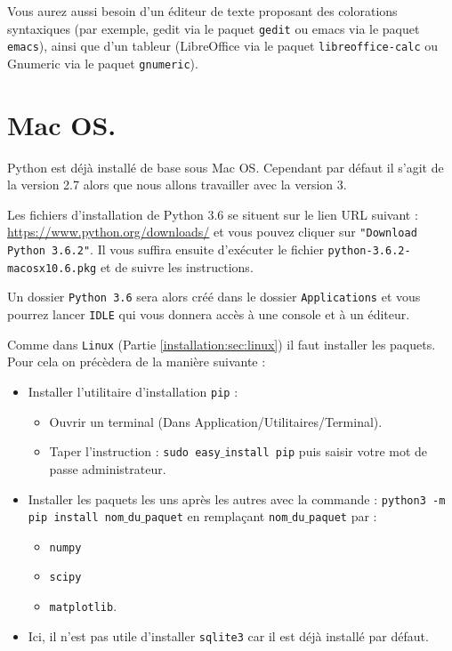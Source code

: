 Vous aurez aussi besoin d'un éditeur de texte proposant des colorations syntaxiques (par exemple, gedit via le paquet \texttt{gedit} ou emacs via le paquet \texttt{emacs}), ainsi que d'un tableur (LibreOffice via le paquet \texttt{libreoffice-calc} ou Gnumeric via le paquet \texttt{gnumeric}).

\section{Mac OS.}

Python est déjà installé de base sous Mac OS. Cependant par défaut il s'agit de la version 2.7 alors que nous allons travailler avec la version 3.

Les fichiers d'installation de Python 3.6 se situent sur le lien URL suivant : \url{https://www.python.org/downloads/} et vous pouvez cliquer sur \texttt{"Download Python 3.6.2"}. Il vous suffira ensuite d'exécuter le fichier \texttt{python-3.6.2-macosx10.6.pkg} et de suivre les instructions.

Un dossier \texttt{Python 3.6} sera alors créé dans le dossier \texttt{Applications} et vous pourrez lancer \texttt{IDLE} qui vous donnera accès à une console et à un éditeur. 

Comme dans \texttt{Linux} (Partie \ref{installation:sec:linux}) il faut installer les paquets. Pour cela on précèdera de la manière suivante :

\begin{itemize}
\item Installer l'utilitaire d'installation \texttt{pip} : 
\begin{itemize}
\item Ouvrir un terminal (Dans Application/Utilitaires/Terminal).
\item Taper l'instruction : \texttt{sudo easy$\_$install pip} puis saisir votre mot de passe administrateur.
\end{itemize}
\item Installer les paquets les uns après les autres avec la commande :
\texttt{python3 -m pip install nom$\_$du$\_$paquet} en remplaçant \texttt{nom$\_$du$\_$paquet} par : 
\begin{itemize}
  \item \texttt{numpy}
  \item \texttt{scipy}
  \item \texttt{matplotlib}.
\end{itemize}
\item Ici, il n'est pas utile d'installer \texttt{sqlite3} car il est déjà installé par défaut.
\end{itemize}

